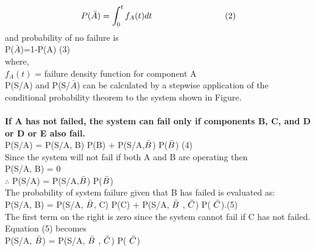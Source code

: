 \documentclass{article}
\begin{document}
\begin{itemize}
\begin{itemize}
    $$P(\Bar{A})=\int_{0}^{t}f_{A}(t)dt \hspace{30mm} (2)$$
    and probability of no failure is \\ \vspace{1mm}
    \hspace{15mm}P($\bar{A}$)=1-P(A)\hspace{30mm} (3)\\
    where,\\ \vspace{2mm}
    \hspace{15mm}$f_{A}(t)$ = failure density function for component A\\
    P(S/A) and P(S/$\bar{A}$) can be calculated by  a stepwise application of the conditional probability theorem to the system shown in Figure.\\ \\
    \textbf{If A has not failed, the system can fail only if components B, C, and D or D or E also fail.}\\\vspace{5mm}
    \hspace{15mm}P(S/A) = P(S/A, B) P(B) + P(S/A,$\Bar{B}$) P($\Bar{B}$)\hspace{30mm} (4) \\
    Since the system will not fail if both A and B are operating then \\\vspace{5mm}
\hspace{15mm}P(S/A, B) = 0 \\ \vspace{5mm}
\hspace{15mm}$\therefore$  P(S/A) =  P(S/A,$\Bar{B}$) P($\Bar{B}$) \\
The probability of system failure given that B has failed is evaluated
as:\\ \vspace{5mm}
\hspace{15mm}P(S/A, B) = P(S/A, $\Bar{B}$, C) P(C) + P(S/A, $\Bar{B}$ , $\Bar{C}$) P( $\Bar{C}$).\hspace{30mm}(5) \\ 
The first term on the right is zero since the system cannot fail if C
has not failed. Equation (5) becomes \\ \vspace{5mm}
\hspace{15mm}P(S/A, $\Bar{B}$) =  P(S/A, $\Bar{B}$ , $\Bar{C}$) P( $\Bar{C}$)\\

\end{itemize}
\end{itemize}
\end{document}
